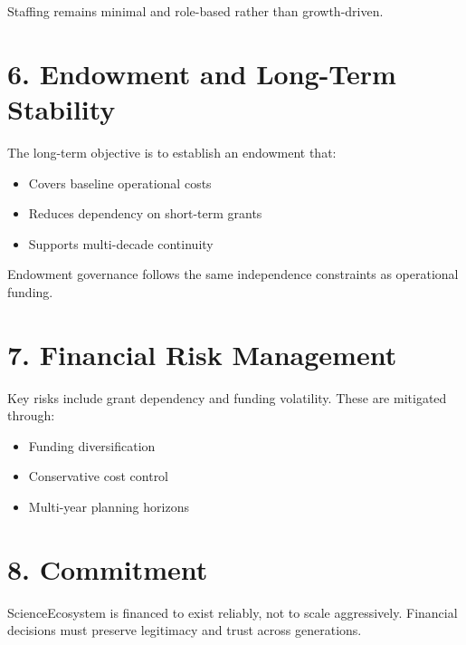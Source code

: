 Staffing remains minimal and role-based rather than growth-driven.

\section*{6. Endowment and Long-Term Stability}

The long-term objective is to establish an endowment that:
\begin{itemize}
    \item Covers baseline operational costs
    \item Reduces dependency on short-term grants
    \item Supports multi-decade continuity
\end{itemize}

Endowment governance follows the same independence constraints as operational funding.

\section*{7. Financial Risk Management}

Key risks include grant dependency and funding volatility. These are mitigated through:
\begin{itemize}
    \item Funding diversification
    \item Conservative cost control
    \item Multi-year planning horizons
\end{itemize}

\section*{8. Commitment}

ScienceEcosystem is financed to exist reliably, not to scale aggressively. Financial decisions must preserve legitimacy and trust across generations.

